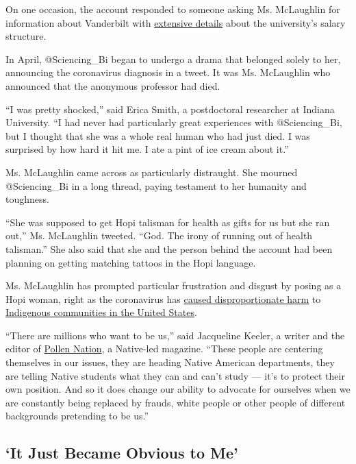 On one occasion, the account responded to someone asking Ms. McLaughlin
for information about Vanderbilt with
\href{https://twitter.com/IsabelOtt/status/1290101201397329921/photo/1}{extensive
details} about the university's salary structure.

In April, @Sciencing\_Bi began to undergo a drama that belonged solely
to her, announcing the coronavirus diagnosis in a tweet. It was Ms.
McLaughlin who announced that the anonymous professor had died.

``I was pretty shocked,'' said Erica Smith, a postdoctoral researcher at
Indiana University. ``I had never had particularly great experiences
with @Sciencing\_Bi, but I thought that she was a whole real human who
had just died. I was surprised by how hard it hit me. I ate a pint of
ice cream about it.''

Ms. McLaughlin came across as particularly distraught. She mourned
@Sciencing\_Bi in a long thread, paying testament to her humanity and
toughness.

``She was supposed to get Hopi talisman for health as gifts for us but
she ran out,'' Ms. McLaughlin tweeted. ``God. The irony of running out
of health talisman.'' She also said that she and the person behind the
account had been planning on getting matching tattoos in the Hopi
language.

Ms. McLaughlin has prompted particular frustration and disgust by posing
as a Hopi woman, right as the coronavirus has
\href{https://www.nytimes.com/2020/04/09/us/coronavirus-navajo-nation.html}{caused
disproportionate harm} to
\href{https://www.nytimes.com/2020/07/30/us/native-americans-coronavirus-data.html}{Indigenous
communities in the United States}.

``There are millions who want to be us,'' said Jacqueline Keeler, a
writer and the editor of
\href{https://www.pollennationmagazine.com/}{Pollen Nation}, a
Native-led magazine. ``These people are centering themselves in our
issues, they are heading Native American departments, they are telling
Native students what they can and can't study --- it's to protect their
own position. And so it does change our ability to advocate for
ourselves when we are constantly being replaced by frauds, white people
or other people of different backgrounds pretending to be us.''

\hypertarget{it-just-became-obvious-to-me}{%
\subsection{`It Just Became Obvious to
Me'}\label{it-just-became-obvious-to-me}}

